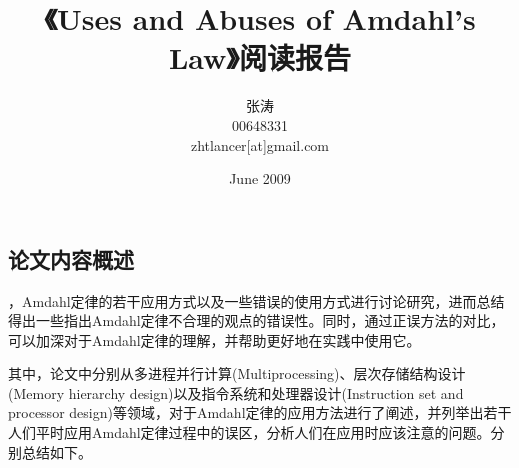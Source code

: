 \documentclass[a4paper,12pt]{article}
\begin{document}
\begin{CJK*}{UTF8}{song}
	
	\newcommand{\chuhao}{\fontsize{42pt}{\baselineskip}\selectfont}
	\newcommand{\xiaochuhao}{\fontsize{36pt}{\baselineskip}\selectfont}
	\newcommand{\yihao}{\fontsize{28pt}{\baselineskip}\selectfont}
	\newcommand{\erhao}{\fontsize{21pt}{\baselineskip}\selectfont}
	\newcommand{\xiaoerhao}{\fontsize{18pt}{\baselineskip}\selectfont}
	\newcommand{\sanhao}{\fontsize{15.75pt}{\baselineskip}\selectfont}
	\newcommand{\sihao}{\fontsize{14pt}{\baselineskip}\selectfont}
	\newcommand{\xiaosihao}{\fontsize{12pt}{1.3\baselineskip}\selectfont}
	\newcommand{\wuhao}{\fontsize{10.5pt}{1.3\baselineskip}\selectfont}
	\newcommand{\xiaowuhao}{\fontsize{9pt}{\baselineskip}\selectfont}
	\newcommand{\liuhao}{\fontsize{7.875pt}{\baselineskip}\selectfont}
	\newcommand{\qihao}{\fontsize{5.25pt}{\baselineskip}\selectfont}

	\title{{\Large{《Uses and Abuses of Amdahl's Law》阅读报告}}}
	\author{张涛 \\ 00648331\\zhtlancer[at]gmail.com}
	\date{June 2009}
	\maketitle

	\section{\large{论文内容概述}}
	，Amdahl定律的若干应用方式以及一些错误的使用方式进行讨论研究，进而总结得出一些指出Amdahl定律不合理的观点的错误性。同时，通过正误方法的对比，可以加深对于Amdahl定律的理解，并帮助更好地在实践中使用它。

	其中，论文中分别从{多进程并行计算(Multiprocessing)}、{层次存储结构设计(Memory hierarchy design)}以及{指令系统和处理器设计(Instruction set and processor design)}等领域，对于Amdahl定律的应用方法进行了阐述，并列举出若干人们平时应用Amdahl定律过程中的误区，分析人们在应用时应该注意的问题。分别总结如下。


\end{CJK*}
\end{document}
